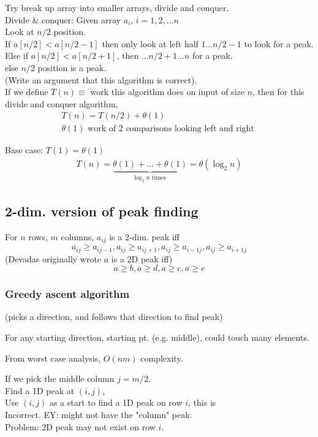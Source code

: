 \documentclass[10pt]{amsart}
\begin{document}
\begin{multicols*}{2}
Try break up array into smaller arrays, divide and conquer. \\
Divide \& conquer: Given array $a_i, \, i = 1, 2, \dots n$ \\
Look at $n/2$ position. \\
If $a[n/2] < a[n/2 - 1]$ then only look at left half $1\dots n/2 - 1$ to look for a peak. \\
Else if $a[n/2] < a[n/2 + 1]$, then $\dots n/2 + 1 \dots n$ for a peak. \\
else $n/2$ position is a peak. \\
(Write an argument that this algorithm is correct). \\

If we define $T(n) \equiv$ work this algorithm does on input of size $n$, then for this divide and conquer algorithm, 
\[
\begin{gathered}
T(n) = T(n/2) + \theta(1) \\
\theta(1) \text{ work of 2 comparisons looking left and right }
\end{gathered}
\]

Base case: $T(1) = \theta(1)$
\[
\begin{gathered}
T(n) = \underbrace{\theta(1) + \dots + \theta(1)}_{\log_2{n} \text{ times } } = \theta(\log_2{n})
\end{gathered}
\]

\subsection{2-dim. version of peak finding}

For $n$ rows, $m$ columns, $a_{ij}$ is a 2-dim. peak iff 
\[
a_{ij} \geq a_{ij-1}, a_{ij} \geq a_{ij+1}, a_{ij} \geq a_{i-1j}, a_{ij} \geq a_{i+1j}
\]
(Devadas originally wrote $a$ is a 2D peak iff)
\[
a \geq b, a \geq d, a\geq c, a\geq e
\]


\subsubsection{Greedy ascent algorithm} (picks a direction, and follows that direction to find peak)

For any starting direction, starting pt. (e.g. middle), could touch many elements. 

From worst case analysis, $O(nm)$ complexity.

If we pick the middle column $j = m/2$. \\
Find a 1D peak at $(i, j)$, \\
Use $(i, j)$ as a start to find a 1D peak on row $i$, this is\\
Incorrect. EY: might not have the "column" peak. \\
Problem: 2D peak may not exist on row $i$.\\


\end{multicols*}
\end{document}

